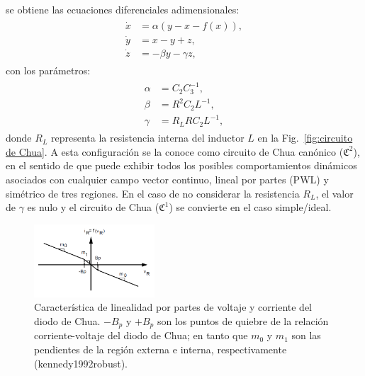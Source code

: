 \documentclass[%
 reprint,
 amsmath,amssymb,
 aps,
]{revtex4-2}
\begin{document}
se obtiene las ecuaciones diferenciales adimen\-sio\-na\-les:
\begin{eqnarray}\label{Chua eq dif}
    \begin{aligned}
        \dot{x} &= \alpha(y - x - f(x)),\\
        \dot{y} &= x-y+z,\\
        \dot{z} &= -\beta y - \gamma z,
    \end{aligned}
\end{eqnarray}
con los parámetros:
\begin{eqnarray}\label{alfa beta gamma}
    \begin{aligned}
        \alpha & = C_{2} C_{3}^{-1},\\
        \beta & = R^{2} C_2 L^{-1}, \\
        \gamma & = R_{L} RC_{2} L^{-1},
    \end{aligned}
\end{eqnarray}
donde $R_L$ representa la resistencia interna del inductor $L$ en la Fig.~\ref{fig:circuito de Chua}. A esta configuración se la conoce como circuito de Chua canónico ($\mathfrak{C}^2$), en el sentido de que puede exhibir todos los posibles comportamientos dinámicos asociados con cualquier campo vector continuo, lineal por partes (PWL) y simétrico de tres regiones. En el caso de no con\-si\-de\-rar la resistencia $R_L$, el valor de $\gamma$ es nulo y el circuito de Chua ($\mathfrak{C}^1$) se convierte en el caso simple/ideal.
\begin{figure}[h]
    \centering
    \includegraphics[width=0.4\textwidth]{Chua/DiodoChua.png}
    \caption{Característica de linealidad por partes de voltaje y corriente del diodo de Chua. $-B_{p}$ y $+B_{p}$ son los puntos de quiebre de la relación corriente-voltaje del diodo de Chua; en tanto que $m_{0}$ y $m_{1}$ son las pendientes de la región externa e interna, respectivamente (kennedy1992robust).} 
    \label{fig:diodo teórico}
\end{figure} 
\end{document}
